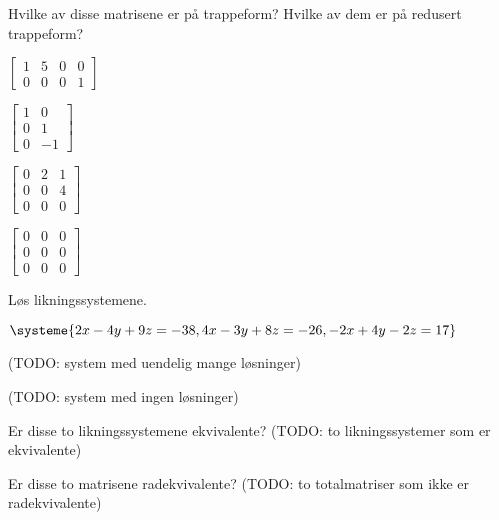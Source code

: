 
\begin{oppgave}
Hvilke av disse matrisene er på trappeform?  Hvilke av dem er på
redusert trappeform?
\begin{punkt}
$
\begin{bmatrix}
1 & 5 & 0 & 0 \\
0 & 0 & 0 & 1
\end{bmatrix}
$
\end{punkt}
\begin{punkt}
$
\begin{bmatrix}
1 & 0 \\
0 & 1 \\
0 & -1
\end{bmatrix}
$
\end{punkt}
\begin{punkt}
$
\begin{bmatrix}
0 & 2 & 1 \\
0 & 0 & 4 \\
0 & 0 & 0
\end{bmatrix}
$
\end{punkt}
\begin{punkt}
$
\begin{bmatrix}
0 & 0 & 0 \\
0 & 0 & 0 \\
0 & 0 & 0
\end{bmatrix}
$
\end{punkt}
\end{oppgave}


\begin{oppgave}
Løs likningssystemene.
\begin{punkt}
$
\systeme{
  2x - 4y + 9z = -38,
  4x - 3y + 8z = -26,
 -2x + 4y - 2z =  17
}
$
\end{punkt}
\begin{punkt}
(TODO: system med uendelig mange løsninger)
\end{punkt}
\begin{punkt}
(TODO: system med ingen løsninger)
\end{punkt}
\end{oppgave}


\begin{oppgave}
\begin{punkt}
Er disse to likningssystemene ekvivalente?
(TODO: to likningssystemer som er ekvivalente)
\end{punkt}
\begin{punkt}
Er disse to matrisene radekvivalente?
(TODO: to totalmatriser som ikke er radekvivalente)
\end{punkt}
\end{oppgave}


